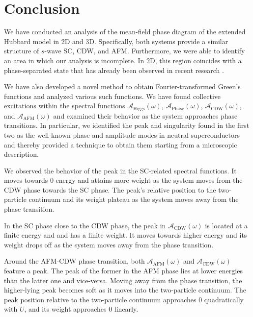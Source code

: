 \documentclass[
    reprint, 
    aps,
    preprintnumbers,
    twocolumn,
    prb,
    superscriptaddress
]{revtex4-2}
\newcommand{\spectral}[1]{\mathcal{A}_\text{#1}  (\omega)}
\begin{document}

\section{Conclusion}\label{sec:conclusion}


We have conducted an analysis of the mean-field phase diagram of the extended Hubbard model in 2D and 3D. 
Specifically, both systems provide a similar structure of $s$-wave SC, CDW, and AFM.
Furthermore, we were able to identify an area in which our analysis is incomplete.
In 2D, this region coincides with a phase-separated state that has already been observed in recent research \cite{Linner23}.

We have also developed a novel method to obtain Fourier-transformed Green's functions and analyzed various such functions. 
We have found collective excitations within the spectral functions $\spectral{Higgs}$, $\spectral{Phase}$, $\spectral{CDW}$, and $\spectral{AFM}$ 
and examined their behavior as the system approaches phase transitions. 
In particular, we identified the peak and singularity found in the first two as the well-known phase and amplitude modes in neutral superconductors 
and thereby provided a technique to obtain them starting from a microscopic description.

We observed the behavior of the peak in the SC-related spectral functions.
It moves towards 0 energy and attains more weight as the system moves from the CDW phase towards the SC phase. 
The peak's relative position to the two-particle continuum and its weight plateau as the system moves away from the phase transition.

In the SC phase close to the CDW phase, the peak in $\spectral{CDW}$ is located at a finite energy and and has a finite weight. 
It moves towards higher energy and its weight drops off as the system moves away from the phase transition. 

Around the AFM-CDW phase transition, both $\spectral{AFM}$ and $\spectral{CDW}$ feature a peak. 
The peak of the former in the AFM phase lies at lower energies than the latter one and vice-versa. 
Moving away from the phase transition, the higher-lying peak becomes soft as it moves into the two-particle continuum. 
The peak position relative to the two-particle continuum approaches $0$ quadratically with $U$, and its weight approaches $0$ linearly.
\end{document}
